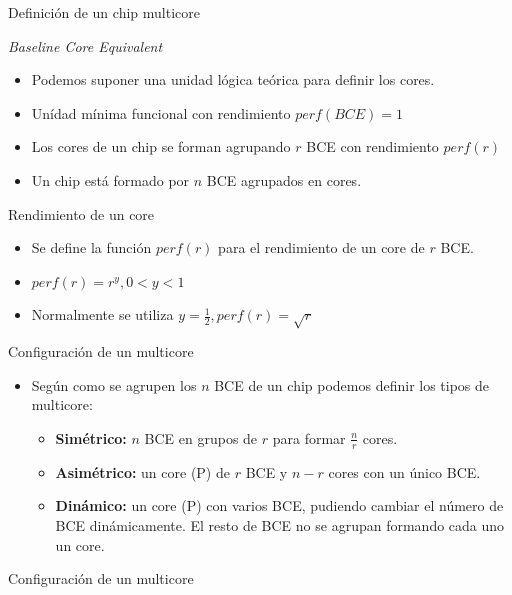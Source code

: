 \documentclass[utf8]{beamer}
\begin{document}
\begin{frame}[allowframebreaks]{Definición de un chip multicore}
    \begin{block}{\emph{Baseline Core Equivalent}}
        \begin{itemize}
        \item Podemos suponer una unidad lógica teórica para definir los cores.
        \item Unídad mínima funcional con rendimiento $perf(BCE) = 1$
        \item Los cores de un chip se forman agrupando $r$ BCE con rendimiento $perf(r)$
        \item Un chip está formado por $n$ BCE agrupados en cores.
        \end{itemize}
    \end{block}
    \begin{block}{Rendimiento de un core}
        \begin{itemize}
            \item Se define la función $perf(r)$ para el rendimiento de un core de $r$ BCE.
            \item $perf(r) = r^y, 0 < y < 1$
            \item Normalmente se utiliza $y = \frac{1}{2}, perf(r) = \sqrt{r}$
        \end{itemize}
    \end{block}
    \begin{block}{Configuración de un multicore}
        \begin{itemize}
        \item Según como se agrupen los $n$ BCE de un chip podemos definir los tipos de multicore:
            \begin{itemize}
                \item \textbf{Simétrico:} $n$ BCE en grupos de $r$ para formar $\frac{n}{r}$ cores.
                \item \textbf{Asimétrico:} un core (P) de $r$ BCE y $n - r$ cores con un único BCE.
                \item \textbf{Dinámico:} un core (P) con varios BCE, pudiendo cambiar el número de BCE dinámicamente. El resto de BCE no se agrupan formando cada uno un core.
            \end{itemize}
        \end{itemize}
    \end{block}
    \begin{block}{Configuración de un multicore}
        \begin{center}

\end{center}
\end{block}
\end{frame}
\end{document}
